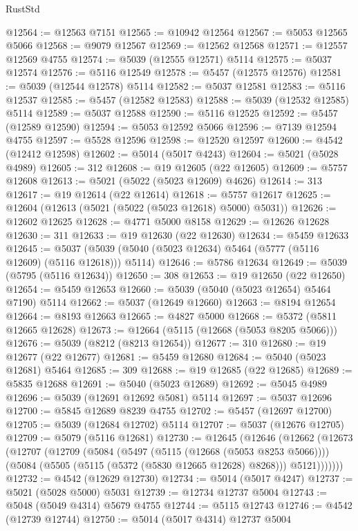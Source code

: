 \begin{lexlean}{RustStd}
\begin{coremodule}
@12564 := @12563 @7151
@12565 := @10942 @12564
@12567 := @5053 @12565 @5066
@12568 := @9079 @12567
@12569 := @12562 @12568
@12571 := @12557 @12569 @4755
@12574 := @5039 (@12555 @12571) @5114
@12575 := @5037 @12574
@12576 := @5116 @12549
@12578 := @5457 (@12575 @12576)
@12581 := @5039 (@12544 @12578) @5114
@12582 := @5037 @12581
@12583 := @5116 @12537
@12585 := @5457 (@12582 @12583)
@12588 := @5039 (@12532 @12585) @5114
@12589 := @5037 @12588
@12590 := @5116 @12525
@12592 := @5457 (@12589 @12590)
@12594 := @5053 @12592 @5066
@12596 := @7139 @12594 @4755
@12597 := @5528 @12596
@12598 := @12520 @12597
@12600 := @4542 (@12412 @12598)
@12602 := @5014 (@5017 @4243)
@12604 := @5021 (@5028 @4989)
@12605 := 312
@12608 := @19 @12605 (@22 @12605)
@12609 := @5757 @12608
@12613 := @5021 (@5022 (@5023 @12609) @4626)
@12614 := 313
@12617 := @19 @12614 (@22 @12614)
@12618 := @5757 @12617
@12625 := @12604 (@12613 (@5021 (@5022 (@5023 @12618) @5000) @5031))
@12626 := @12602 @12625
@12628 := @4771 @5000 @8158
@12629 := @12626 @12628
@12630 := 311
@12633 := @19 @12630 (@22 @12630)
@12634 := @5459 @12633
@12645 := @5037 (@5039 (@5040 (@5023 @12634) @5464 (@5777 (@5116 @12609) (@5116 @12618))) @5114)
@12646 := @5786 @12634
@12649 := @5039 (@5795 (@5116 @12634))
@12650 := 308
@12653 := @19 @12650 (@22 @12650)
@12654 := @5459 @12653
@12660 := @5039 (@5040 (@5023 @12654) @5464 @7190) @5114
@12662 := @5037 (@12649 @12660)
@12663 := @8194 @12654
@12664 := @8193 @12663
@12665 := @4827 @5000
@12668 := @5372 (@5811 @12665 @12628)
@12673 := @12664 (@5115 (@12668 (@5053 @8205 @5066)))
@12676 := @5039 (@8212 (@8213 @12654))
@12677 := 310
@12680 := @19 @12677 (@22 @12677)
@12681 := @5459 @12680
@12684 := @5040 (@5023 @12681) @5464
@12685 := 309
@12688 := @19 @12685 (@22 @12685)
@12689 := @5835 @12688
@12691 := @5040 (@5023 @12689)
@12692 := @5045 @4989
@12696 := @5039 (@12691 @12692 @5081) @5114
@12697 := @5037 @12696
@12700 := @5845 @12689 @8239 @4755
@12702 := @5457 (@12697 @12700)
@12705 := @5039 (@12684 @12702) @5114
@12707 := @5037 (@12676 @12705)
@12709 := @5079 (@5116 @12681)
@12730 := @12645
    (@12646
      (@12662
        (@12673
          (@12707
            (@12709
              (@5084
                (@5497 (@5115 (@12668 (@5053 @8253 @5066))))
                (@5084 (@5505 (@5115 (@5372 (@5830 @12665 @12628) @8268))) @5121)))))))
@12732 := @4542 (@12629 @12730)
@12734 := @5014 (@5017 @4247)
@12737 := @5021 (@5028 @5000) @5031
@12739 := @12734 @12737 @5004
@12743 := @5048 (@5049 @4314) @5679 @4755
@12744 := @5115 @12743
@12746 := @4542 (@12739 @12744)
@12750 := @5014 (@5017 @4314) @12737 @5004

\end{coremodule}
\end{lexlean}
